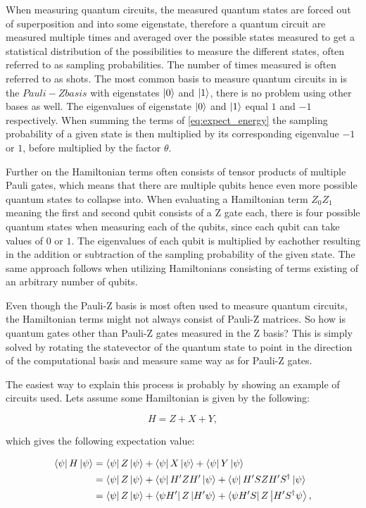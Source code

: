 \documentclass[../main.tex]{subfiles}
\begin{document}
When measuring quantum circuits, the measured quantum states are forced out of superposition and into some eigenstate, therefore a quantum circuit are measured multiple times and averaged over the possible states measured to get a statistical distribution of the possibilities to measure the different states, often referred to as sampling probabilities. The number of times measured is often referred to as shots. The most common basis to measure quantum circuits in is the $Pauli-Z basis$ with eigenstates $\ket{0}$ and $\ket{1}$, there is no problem using other bases as well. The eigenvalues of eigenstate $\ket{0}$ and $\ket{1}$ equal $1$ and $-1$ respectively. When summing the terms of \autoref{eq:expect_energy} the sampling probability of a given state is then multiplied by its corresponding eigenvalue $-1$ or $1$, before multiplied by the factor $\theta$.

Further on the Hamiltonian terms often consists of tensor products of multiple Pauli gates, which means that there are multiple qubits hence even more possible quantum states to collapse into. When evaluating a Hamiltonian term  $Z_0 Z_1$ meaning the first and second qubit consists of a Z gate each, there is four possible quantum states when measuring each of the qubits, since each qubit can take values of $0$ or $1$. The eigenvalues of each qubit is multiplied by eachother resulting in the addition or subtraction of the sampling probability of the given state. The same approach follows when utilizing Hamiltonians consisting of terms existing of an arbitrary number of qubits.

Even though the Pauli-Z basis is most often used to measure quantum circuits, the Hamiltonian terms might not always consist of Pauli-Z matrices. So how is quantum gates other than Pauli-Z gates measured in the Z basis? This is simply solved by rotating the statevector of the quantum state to point in the direction of the computational basis and measure same way as for Pauli-Z gates.

The easiest way to explain this process is probably by showing an example of circuits used. Lets assume some Hamiltonian is given by the following:

\begin{equation}
    H=Z+X+Y,
\end{equation}

which gives the following expectation value:

\begin{align*}
    \bra{\psi}H\ket{\psi}&=\bra{\psi}Z\ket{\psi}+\bra{\psi}X\ket{\psi}+\bra{\psi}Y\ket{\psi}\\
    &=\bra{\psi}Z\ket{\psi}+\bra{\psi}H^\prime ZH^\prime \ket{\psi}+\bra{\psi}H^\prime SZH^\prime S^\dagger\ket{\psi}\\
    &=\bra{\psi}Z\ket{\psi}+\bra{\psi H^\prime}Z\ket{H^\prime \psi}+\bra{\psi H^\prime S}Z\ket{H^\prime S^{\dagger}\psi},
\end{align*}
\end{document}
